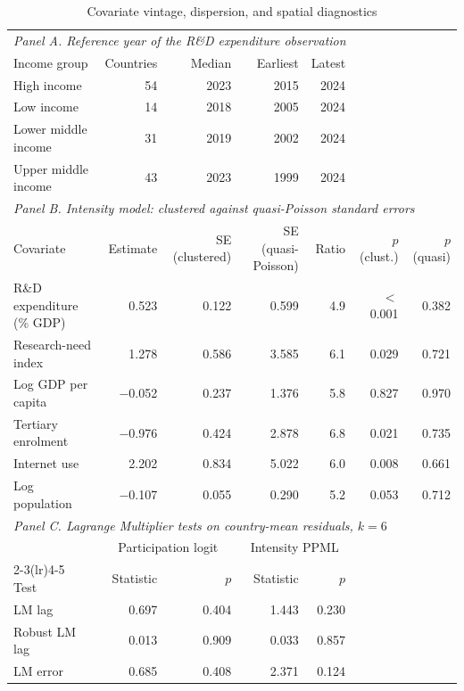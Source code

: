 \begin{table}[!t]
\centering
\footnotesize
\caption{Covariate vintage, dispersion, and spatial diagnostics}
\label{tab:diagnostics}
\begin{tabular*}{\textwidth}{@{\extracolsep\fill}l r r r r r r@{}}
\toprule
\multicolumn{7}{l}{\textit{Panel A. Reference year of the R\&D expenditure observation}} \\
Income group & Countries & Median & Earliest & Latest & \multicolumn{2}{c}{} \\
\midrule
High income & 54 & 2023 & 2015 & 2024 & \multicolumn{2}{c}{} \\
Low income & 14 & 2018 & 2005 & 2024 & \multicolumn{2}{c}{} \\
Lower middle income & 31 & 2019 & 2002 & 2024 & \multicolumn{2}{c}{} \\
Upper middle income & 43 & 2023 & 1999 & 2024 & \multicolumn{2}{c}{} \\
\midrule
\multicolumn{7}{l}{\textit{Panel B. Intensity model: clustered against quasi-Poisson standard errors}} \\
Covariate & Estimate & SE (clustered) & SE (quasi-Poisson) & Ratio & $p$ (clust.) & $p$ (quasi) \\
\midrule
R\&D expenditure (\% GDP) & 0.523 & 0.122 & 0.599 & 4.9 & $<$0.001 & 0.382 \\
Research-need index & 1.278 & 0.586 & 3.585 & 6.1 & 0.029 & 0.721 \\
Log GDP per capita & $-$0.052 & 0.237 & 1.376 & 5.8 & 0.827 & 0.970 \\
Tertiary enrolment & $-$0.976 & 0.424 & 2.878 & 6.8 & 0.021 & 0.735 \\
Internet use & 2.202 & 0.834 & 5.022 & 6.0 & 0.008 & 0.661 \\
Log population & $-$0.107 & 0.055 & 0.290 & 5.2 & 0.053 & 0.712 \\
\midrule
\multicolumn{7}{l}{\textit{Panel C. Lagrange Multiplier tests on country-mean residuals, $k=6$}} \\
& \multicolumn{2}{c}{Participation logit} & \multicolumn{2}{c}{Intensity PPML} & \multicolumn{2}{c}{} \\
\cmidrule(lr){2-3}\cmidrule(lr){4-5}
Test & Statistic & $p$ & Statistic & $p$ & \multicolumn{2}{c}{} \\
\midrule
LM lag & 0.697 & 0.404 & 1.443 & 0.230 & \\
Robust LM lag & 0.013 & 0.909 & 0.033 & 0.857 & \\
LM error & 0.685 & 0.408 & 2.371 & 0.124 & \\

\end{tabular*}
\end{table}

